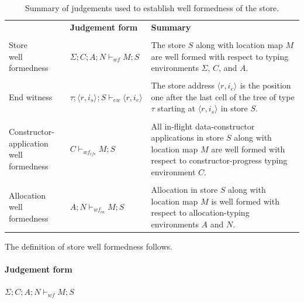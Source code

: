 \documentclass[showabstract,showacknowledgments,showpreface,showdedication,school]{iuphd}
\theoremstyle{nonumberplain}
\newcommand{\keywd}[1]{\mathit{#1}}
\newcommand{\skeywd}[1]{\mathit{#1}}
\newcommand{\TYP}{\keywd{\tau}}
\newcommand{\concreteloc}[3]{\ensuremath{\langle #1, #2 \rangle ^{#3}}}
\newcommand{\reg}{\skeywd{r}}
\newcommand{\ind}{\keywd{i}}
\newcommand{\STOR}{\keywd{S}}
\newcommand{\CENV}{\keywd{C}}
\newcommand{\SENV}{\keywd{\Sigma}}
\newcommand{\MENV}{\keywd{M}}
\newcommand{\AENV}{\keywd{A}}
\newcommand{\NENV}{\keywd{N}}
\newcommand{\ewitness}[4]{\ensuremath{#1;#2;#3 \vdash_{ew} #4}}
\newcommand{\storewf}[6]{\ensuremath{#1;#2;#3;#4 \vdash_{wf} #5;#6}}
\newcommand{\storewfcfa}[3]{\ensuremath{#1 \vdash_{wf_{cfc}} #2;#3}}
\newcommand{\storewfca}[4]{\ensuremath{#1;#2 \vdash_{wf_{ca}} #3;#4}}
\begin{document}
\begin{table}
\bgroup
\begin{tabular}{llp{8cm}}
 & \textbf{Judgement form} & \textbf{Summary}
 \\\\
\parbox[t]{3.5cm}{Store \\ well formedness} & $\storewf{\SENV}{\CENV}{\AENV}{\NENV}{\MENV}{\STOR}$ &

The store $\STOR$ along with location map $\MENV$ are well formed with respect to
typing environments $\SENV$, $\CENV$, and $\AENV$.
\\\\
End witness & $\ewitness{\TYP}{\concreteloc{\reg}{\ind_{s}}{}}{\STOR}{\concreteloc{\reg}{\ind_{e}}{}}$ &

The store address $\concreteloc{\reg}{\ind_{e}}{}$ is the position one
after the last cell of the tree of type $\TYP$ starting at
$\concreteloc{\reg}{\ind_{s}}{}$ in store $\STOR$.
\\\\
\parbox[t]{3.5cm}{Constructor-application \\ well formedness}
 & $\storewfcfa{\CENV}{\MENV}{\STOR}$ &

All in-flight data-constructor applications in store $\STOR$ along with location map $\MENV$
are well formed with respect to constructor-progress typing environment $\CENV$.
\\\\
\parbox[t]{3.5cm}{Allocation \\ well formedness} & $\storewfca{\AENV}{\NENV}{\MENV}{\STOR}$ &

Allocation in store $\STOR$ along with location map $\MENV$ is well formed
with respect to allocation-typing environments $\AENV$ and $\NENV$.
\end{tabular}
\egroup
\caption{Summary of judgements used to establish well formedness of the store.}
\label{tbl:swf-judgements}
\end{table}







The definition of store well formedness follows.

\paragraph{Judgement form}

$\storewf{\SENV}{\CENV}{\AENV}{\NENV}{\MENV}{\STOR}$
\end{document}
